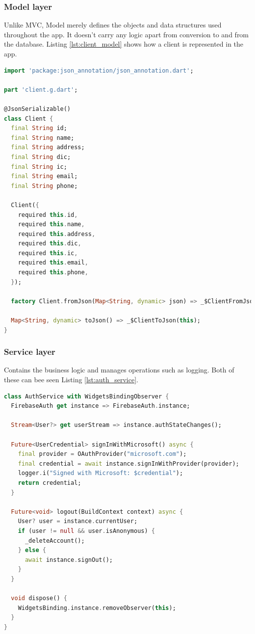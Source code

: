 \documentclass[
  digital,     %
  oneside,     %
  nosansbold,  %
  nocolorbold, %
  lof,         %
  lot,         %
]{fithesis4}
\begin{document}
\newpage
\subsubsection{Model layer}

Unlike \gls{MVC}, Model merely defines the objects and data structures used throughout the app. It doesn't carry any logic apart from conversion to and from the database. Listing \ref{lst:client_model} shows how a client is represented in the app.

\begin{lstlisting}[language=Dart, caption={Model layer example on Client class}, label={lst:client_model}, floatplacement=H, showstringspaces=false]
import 'package:json_annotation/json_annotation.dart';

part 'client.g.dart';

@JsonSerializable()
class Client {
  final String id;
  final String name;
  final String address;
  final String dic;
  final String ic;
  final String email;
  final String phone;

  Client({
    required this.id,
    required this.name,
    required this.address,
    required this.dic,
    required this.ic,
    required this.email,
    required this.phone,
  });

  factory Client.fromJson(Map<String, dynamic> json) => _$ClientFromJson(json);

  Map<String, dynamic> toJson() => _$ClientToJson(this);
}
\end{lstlisting}

\subsubsection{Service layer}

Contains the business logic and manages operations such as logging. Both of these can bee seen Listing \ref{lst:auth_service}.

\begin{lstlisting}[language=Dart, caption={Service layer example on Firebase AuthService class}, label={lst:auth_service}, floatplacement=H, showstringspaces=false]
class AuthService with WidgetsBindingObserver {
  FirebaseAuth get instance => FirebaseAuth.instance;

  Stream<User?> get userStream => instance.authStateChanges();

  Future<UserCredential> signInWithMicrosoft() async {
    final provider = OAuthProvider("microsoft.com");
    final credential = await instance.signInWithProvider(provider);
    logger.i("Signed with Microsoft: $credential");
    return credential;
  }

  Future<void> logout(BuildContext context) async {
    User? user = instance.currentUser;
    if (user != null && user.isAnonymous) {
      _deleteAccount();
    } else {
      await instance.signOut();
    }
  }

  void dispose() {
    WidgetsBinding.instance.removeObserver(this);
  }
}
\end{lstlisting}
\end{document}
